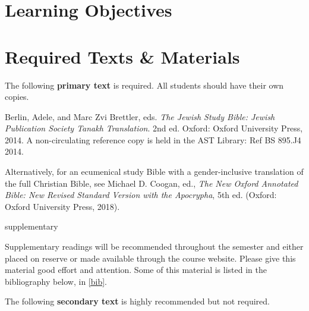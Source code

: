 \documentclass[titlepage]{article}
\newcommand\incl{../includes}
\begin{document}


  \section{Learning Objectives}
  \label{objectives}

  \edobject

\section{Required Texts \& Materials}
\label{texts}

The following \textbf{primary text} is required. All students should have their own copies.

\begingroup
\renewcommand{\section}[2]{}%
\begin{thebibliography}{NJPS}%

	 Berlin, Adele, and Marc Zvi Brettler, eds.
    \emph{The Jewish Study Bible: Jewish Publication Society Tanakh Translation}.
    2nd ed. Oxford: Oxford University Press, 2014.
     A non-circulating reference copy is held in the AST Library: Ref BS 895.J4 2014.

\end{thebibliography}
\endgroup

Alternatively, for an ecumenical study Bible with a gender-inclusive
translation of the full Christian Bible, see Michael D. Coogan, ed.,
\emph{The New Oxford Annotated Bible: New Revised Standard Version with
the Apocrypha}, 5th ed. (Oxford: Oxford University Press, 2018).

\section{Supplementary Texts}
\label{supplementary}

Supplementary readings will be recommended throughout the semester and
either placed on reserve or made available through the course website.
Please give this material good effort and attention. Some of this
material is listed in the bibliography below, in \autoref{bib}.

The following \textbf{secondary text} is highly recommended but not required.
\end{document}
